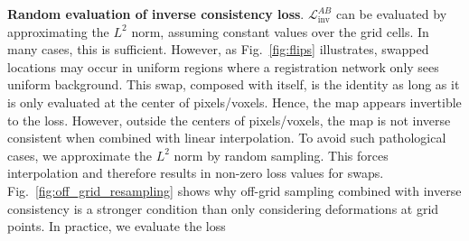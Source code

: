 \noindent
\textbf{Random evaluation of inverse consistency loss}.
$\mathcal{L}_{\text{inv}}^{AB}$ can be evaluated by approximating the $L^2$ norm, assuming constant values over the grid cells. In many cases, this is sufficient. However, as Fig.~\ref{fig:flips} illustrates, swapped locations may occur in uniform regions  where a registration network only sees uniform background. This swap, composed with itself, is the identity as long as it is only evaluated at the center of pixels/voxels. Hence, the map appears invertible to the loss. However, outside the centers of pixels/voxels, the map is not inverse consistent when combined with linear interpolation. To avoid such pathological cases, we approximate the $L^2$ norm by random sampling. This forces interpolation and therefore results in non-zero loss values for swaps. Fig.~\ref{fig:off_grid_resampling} shows why off-grid sampling combined with inverse consistency is a stronger condition than only considering deformations at grid points. In practice, we evaluate the loss



